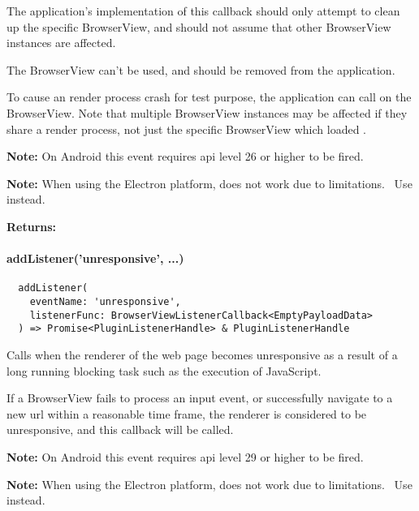The application's implementation of this callback should only attempt to clean up the specific BrowserView,
and should not assume that other BrowserView instances are affected.

The BrowserView can't be used, and should be removed from the application.

To cause an render process crash for test purpose, the application can
call  on the BrowserView.
Note that multiple BrowserView instances may be affected if they share a render process,
not just the specific BrowserView which loaded .

\textbf{Note:} On Android this event requires \ac{api} level 26 or higher to be fired.~\cite{android:api}

\textbf{Note:} When using the Electron platform,  does not work due to limitations.~\cite{capacitor-electron}
Use  instead.

\textbf{Returns:} 



\paragraph{addListener('unresponsive', ...)}

\begin{verbatim}
  addListener(
    eventName: 'unresponsive',
    listenerFunc: BrowserViewListenerCallback<EmptyPayloadData>
  ) => Promise<PluginListenerHandle> & PluginListenerHandle
\end{verbatim}

Calls  when the renderer of the web page becomes unresponsive as a result
of a long running blocking task such as the execution of JavaScript.

If a BrowserView fails to process an input event, or successfully navigate to a new \ac{url} within a reasonable time frame,
the renderer is considered to be unresponsive, and this callback will be called.

\textbf{Note:} On Android this event requires \ac{api} level 29 or higher to be fired.~\cite{android:api}

\textbf{Note:} When using the Electron platform,  does not work due to limitations.~\cite{capacitor-electron}
Use  instead.

